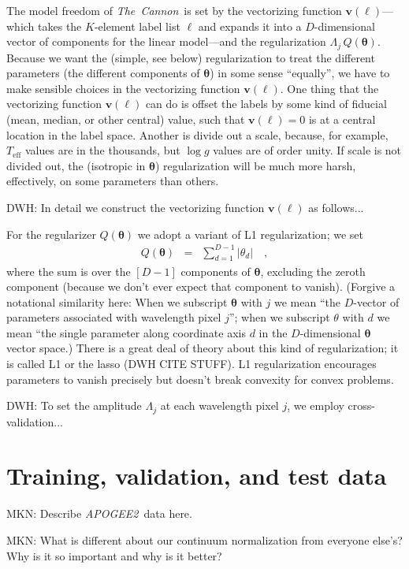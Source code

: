 \documentclass[12pt,preprint]{aastex}
\newcommand{\project}[1]{\textsl{#1}}
\newcommand{\TheCannon}{\project{The~Cannon}}
\newcommand{\acronym}[1]{{\small{#1}}}
\newcommand{\apogee}{\project{\acronym{APOGEE2}}}
\newcommand{\logg}{\log g}
\newcommand{\Teff}{T_{\mathrm{eff}}}
\newcommand{\Dvector}[1]{\boldsymbol{#1}}
\newcommand{\vectheta}{\Dvector{\theta}}
\newcommand{\vecv}{\Dvector{v}}
\begin{document}
The model freedom of \TheCannon\ is set by the vectorizing function
$\vecv(\ell)$---which takes the $K$-element label list $\ell$ and expands
it into a $D$-dimensional vector of components for the linear
model---and the regularization $\Lambda_j\,Q(\vectheta)$.
Because we want the (simple, see below) regularization to treat the
different parameters (the different components of $\vectheta$) in some
sense ``equally'', we have to make sensible choices in the vectorizing
function $\vecv(\ell)$.
One thing that the vectorizing function $\vecv(\ell)$ can do is offset the
labels by some kind of fiducial (mean, median, or other central)
value, such that $\vecv(\ell)=0$ is at a central location in the label
space.
Another is divide out a scale, because, for example, $\Teff$ values
are in the thousands, but $\logg$ values are of order unity.
If scale is not divided out, the (isotropic in $\vectheta$)
regularization will be much more harsh, effectively, on some
parameters than others.

DWH: In detail we construct the vectorizing function $\vecv(\ell)$ as follows...

For the regularizer $Q(\vectheta)$ we adopt a variant of L1
regularization; we set
\begin{eqnarray}
  Q(\vectheta) &=& \sum_{d=1}^{D-1} |\theta_d|
  \quad,
\end{eqnarray}
where the sum is over the $[D-1]$ components of $\vectheta$, excluding
the zeroth component (because we don't ever expect that component to
vanish).
(Forgive a notational similarity here: When we subscript $\vectheta$ with
$j$ we mean ``the $D$-vector of parameters associated with wavelength
pixel $j$''; when we subscript $\theta$ with $d$ we mean ``the single
parameter along coordinate axis $d$ in the $D$-dimensional $\vectheta$
vector space.)
There is a great deal of theory about this kind of regularization; it
is called L1 or the lasso (DWH CITE STUFF).
L1 regularization encourages parameters to vanish precisely but
doesn't break convexity for convex problems.

DWH: To set the amplitude $\Lambda_j$ at each wavelength pixel $j$, we
employ cross-validation...

\section{Training, validation, and test data}

MKN: Describe \apogee\ data here.

MKN: What is different about our continuum normalization from everyone else's?
Why is it so important and why is it better?
\end{document}
